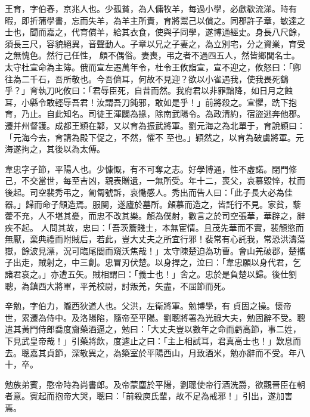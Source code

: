 \begin{pinyinscope}
 王育，字伯春，京兆人也。少孤貧，為人傭牧羊，每過小學，必歔欷流涕。時有暇，即折蒲學書，忘而失羊，為羊主所責，育將鬻己以償之。同郡許子章，敏達之士也，聞而嘉之，代育償羊，給其衣食，使與子同學，遂博通經史。身長八尺餘，須長三尺，容貌絕異，音聲動人。子章以兄之子妻之，為立別宅，分之資業，育受之無愧色。然行己任性，
 頗不偶俗。妻喪，弔之者不過四五人，然皆鄉閭名士。太守杜宣命為主簿。俄而宣左遷萬年令，杜令王攸詣宣，宣不迎之，攸怒曰：「卿往為二千石，吾所敬也。今吾儕耳，何故不見迎？欲以小雀遇我，使我畏死鷂乎？」育執刀叱攸曰：「君辱臣死，自昔而然。我府君以非罪黜降，如日月之蝕耳，小縣令敢輕辱吾君！汝謂吾刀鈍邪，敢如是乎！」前將殺之。宣懼，跣下抱育，乃止。自此知名。司徒王渾闢為掾，除南武陽令。為政清約，宿盜逃奔他郡。遷并州督護。成都王穎在鄴，又以育為振武將軍。劉元海之為北單于，育說穎曰：「元海今去，育請為殿下促之，不然，懼不
 至也。」穎然之，以育為破虜將軍。元海遂拘之，其後以為太傅。



 韋忠字子節，平陽人也。少慷慨，有不可奪之志。好學博通，性不虛諾。閉門修己，不交當世，每至吉凶，親表贈遺，一無所受。年十二，喪父，哀慕毀悴，杖而後起。司空裴秀弔之，匍匐號訴，哀慟感人。秀出而告人曰：「此子長大必為佳器。」歸而命子頠造焉。服闋，遂廬於墓所。頠慕而造之，皆託行不見。家貧，藜藿不充，人不堪其憂，而忠不改其樂。頠為僕射，數言之於司空張華，華辟之，辭疾不起。
 人問其故，忠曰：「吾茨簷賤士，本無宦情。且茂先華而不實，裴頠慾而無厭，棄典禮而附賊后，若此，豈大丈夫之所宜行邪！裴常有心託我，常恐洪濤蕩嶽，餘波見漂，況可臨尾閭而窺沃焦哉！」太守陳楚迫為功曹。會山羌破郡，楚攜子出走，賊射之，中三創。忠冒刃伏楚。以身捍之，泣曰：「韋忠願以身代君，乞諸君哀之。」亦遭五矢。賊相謂曰：「義士也！」舍之。忠於是負楚以歸。後仕劉聰，為鎮西大將軍，平羌校尉，討叛羌，矢盡，不屈節而死。



 辛勉，字伯力，隴西狄道人也。父洪，左衛將軍。勉博學，有
 貞固之操。懷帝世，累遷為侍中。及洛陽陷，隨帝至平陽。劉聰將署為光祿大夫，勉固辭不受。聰遣其黃門侍郎喬度齎藥酒逼之，勉曰：「大丈夫豈以數年之命而虧高節，事二姓，下見武皇帝哉！」引藥將飲，度遽止之曰：「主上相試耳，君真高士也！」歎息而去。聰嘉其貞節，深敬異之，為築室於平陽西山，月致酒米，勉亦辭而不受。年八十，卒。



 勉族弟賓，愍帝時為尚書郎。及帝蒙塵於平陽，劉聰使帝行酒洗爵，欲觀晉臣在朝者意。賓起而抱帝大哭，聰曰：「前殺庾氏輩，故不足為戒邪！」引出，遂加害焉。




\end{pinyinscope}
